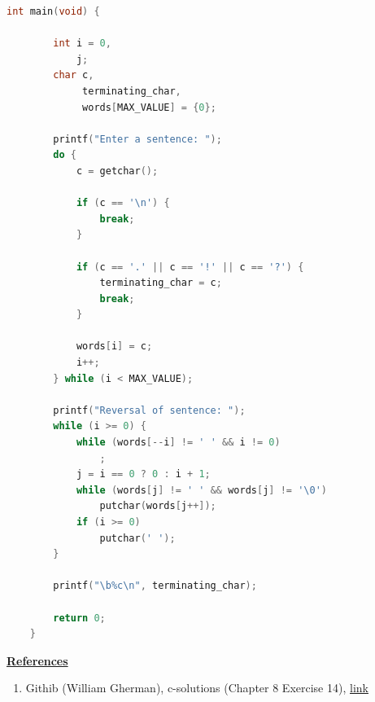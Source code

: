 \documentclass[12pt]{article}
\begin{document}
\begin{enumerate}[1.]
\begin{lstlisting}[language=c]
    int main(void) {

        int i = 0,
            j;
        char c,
             terminating_char,
             words[MAX_VALUE] = {0};

        printf("Enter a sentence: ");
        do {
            c = getchar();

            if (c == '\n') {
                break;
            }

            if (c == '.' || c == '!' || c == '?') {
                terminating_char = c;
                break;
            }

            words[i] = c;
            i++;
        } while (i < MAX_VALUE);

        printf("Reversal of sentence: ");
        while (i >= 0) {
            while (words[--i] != ' ' && i != 0)
                ;
            j = i == 0 ? 0 : i + 1;
            while (words[j] != ' ' && words[j] != '\0')
                putchar(words[j++]);
            if (i >= 0)
                putchar(' ');
        }

        printf("\b%c\n", terminating_char);

        return 0;
    }
\end{lstlisting}

    \bigskip

    \underline{\textbf{References}}

    \begin{enumerate}[1)]
        \item Githib (William Gherman), c-solutions (Chapter 8 Exercise 14), \href{https://github.com/williamgherman/c-solutions/blob/master/08/projects/14/14.c}{link}
    \end{enumerate}

\end{enumerate}
\end{document}
